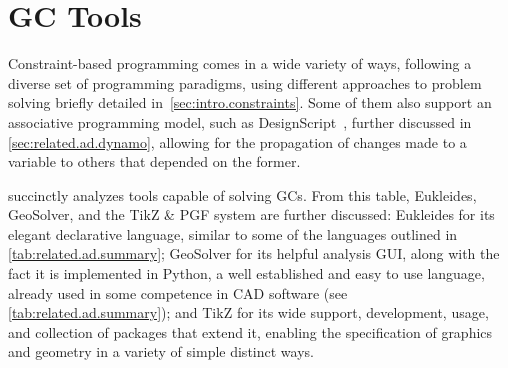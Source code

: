 \section{\Acl{GC} Tools}%
\label{sec:related.constraints}

Constraint-based programming comes in a wide variety of ways, following a
diverse set of programming paradigms, using different approaches to problem
solving briefly detailed in~\cref{sec:intro.constraints}.  Some of them also
support an associative programming model, such as
DesignScript~\cite{Aish:2011:DesignScript}, further discussed in
\cref{sec:related.ad.dynamo}, allowing for the propagation of changes made to a
variable to others that depended on the former.

 succinctly analyzes tools capable of
solving \acp{GC}.  From this table, Eukleides, GeoSolver, and the \acs{TikZ} \&
\acs{PGF} system are further discussed: Eukleides for its elegant declarative
language, similar to some of the languages outlined in
\cref{tab:related.ad.summary}; GeoSolver for its helpful analysis \ac{GUI},
along with the fact it is implemented in Python, a well established and easy to
use language, already used in some competence in \ac{CAD} software (see
\cref{tab:related.ad.summary}); and \ac{TikZ} for its wide support, development,
usage, and collection of packages that extend it, enabling the specification of
graphics and geometry in a variety of simple distinct ways.

